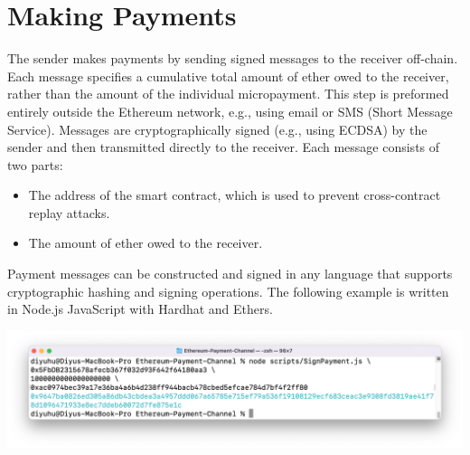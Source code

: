 \section{Making Payments}\label{sec:making-payments}
The sender makes payments by sending signed messages to the receiver off-chain.
Each message specifies a cumulative total amount of ether owed to the receiver, rather than the amount of the individual
micropayment.
This step is preformed entirely outside the Ethereum network, e.g., using email or SMS (Short Message Service).
Messages are cryptographically signed (e.g., using ECDSA) by the sender and then transmitted directly to the receiver.
Each message consists of two parts:

\begin{itemize}
    \item The address of the smart contract, which is used to prevent cross-contract replay attacks.
    \item The amount of ether owed to the receiver.
\end{itemize}

Payment messages can be constructed and signed in any language that supports cryptographic hashing and signing
operations.
The following example is written in Node.js JavaScript with Hardhat and Ethers.



\includegraphics[width=\textwidth]{./images/sign-message-example}